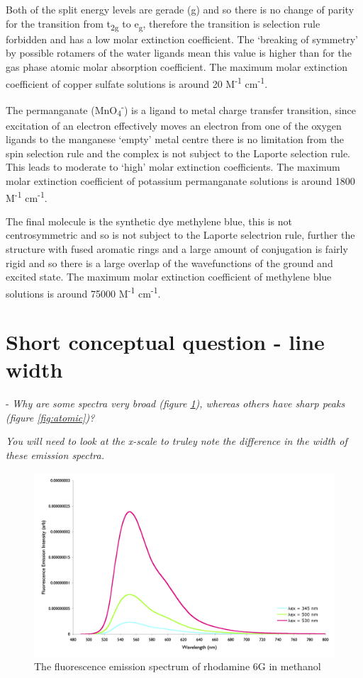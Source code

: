 \documentclass[
]{book}
\begin{document}
Both of the split energy levels are gerade (g) and so there is no change of parity for the transition from t\textsubscript{2g} to e\textsubscript{g}, therefore the transition is selection rule forbidden and has a low molar extinction coefficient. The `breaking of symmetry' by possible rotamers of the water ligands mean this value is higher than for the gas phase atomic molar absorption coefficient. The maximum molar extinction coefficient of copper sulfate solutions is around 20 M\textsuperscript{-1} cm\textsuperscript{-1}.

The permanganate (MnO\textsubscript{4}\textsuperscript{-}) is a ligand to metal charge transfer transition, since excitation of an electron effectively moves an electron from one of the oxygen ligands to the manganese `empty' metal centre there is no limitation from the spin selection rule and the complex is not subject to the Laporte selection rule. This leads to moderate to `high' molar extinction coefficients. The maximum molar extinction coefficient of potassium permanganate solutions is around 1800 M\textsuperscript{-1} cm\textsuperscript{-1}.

The final molecule is the synthetic dye methylene blue, this is not centrosymmetric and so is not subject to the Laporte selectrion rule, further the structure with fused aromatic rings and a large amount of conjugation is fairly rigid and so there is a large overlap of the wavefunctions of the ground and excited state. The maximum molar extinction coefficient of methylene blue solutions is around 75000 M\textsuperscript{-1} cm\textsuperscript{-1}.

\hypertarget{sec:linewidth}{%
\section{Short conceptual question - line width}\label{sec:linewidth}}

- \emph{Why are some spectra very broad (figure \ref{fig:molecular}), whereas others have sharp peaks (figure \ref{fig:atomic})?}

\emph{You will need to look at the x-scale to truley note the difference in the width of these emission spectra.}

\begin{figure}

{\centering \includegraphics[width=0.7\linewidth]{images/rhodamine6G} 

}

\caption{The fluorescence emission spectrum of rhodamine 6G in methanol}\label{fig:molecular}
\end{figure}
\end{document}
